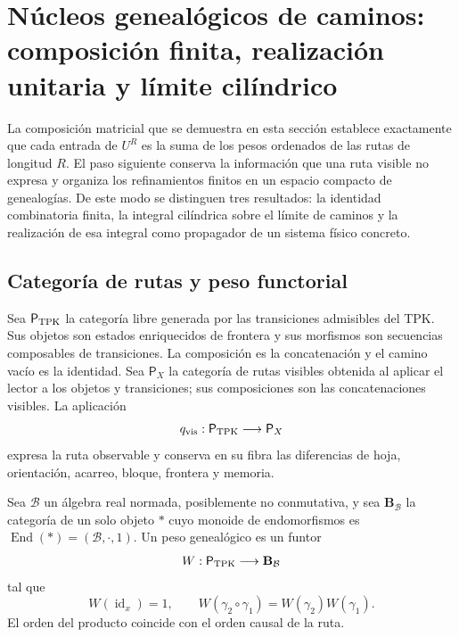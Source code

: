 \section{Núcleos genealógicos de caminos: composición finita, realización unitaria y límite cilíndrico}
\label{sec:integral-genealogica-caminos-rev2}

La composición matricial que se demuestra en esta sección establece exactamente que cada entrada de
\(U^R\) es la suma de los pesos ordenados de las rutas de longitud \(R\).
El paso siguiente conserva la información que una ruta visible no expresa y
organiza los refinamientos finitos en un espacio compacto de genealogías. De
este modo se distinguen tres resultados: la identidad combinatoria finita, la
integral cilíndrica sobre el límite de caminos y la realización de esa
integral como propagador de un sistema físico concreto.

\subsection{Categoría de rutas y peso functorial}

Sea \(\mathsf P_{\rm TPK}\) la categoría libre generada por las transiciones
admisibles del TPK. Sus objetos son estados enriquecidos de frontera y sus
morfismos son secuencias composables de transiciones. La composición es la
concatenación y el camino vacío es la identidad. Sea \(\mathsf P_X\)
la categoría de rutas visibles obtenida al aplicar el lector a los
objetos y transiciones; sus composiciones son las concatenaciones visibles.
La aplicación
\[
 q_{\rm vis}:\mathsf P_{\rm TPK}\longrightarrow\mathsf P_X
\]
expresa la ruta observable y conserva en su fibra las diferencias de hoja,
orientación, acarreo, bloque, frontera y memoria.

\begin{definition}
\label{def:peso-genealogico-caminos-rev2}
Sea \(\mathcal B\) un álgebra real normada, posiblemente no conmutativa, y
sea \(\mathbf B_{\mathcal B}\) la categoría de un solo objeto \(\ast\) cuyo
monoide de endomorfismos es
\(\operatorname{End}(\ast)=(\mathcal B,\cdot,1)\). Un peso genealógico es un funtor
\[
 W:\mathsf P_{\rm TPK}\longrightarrow\mathbf B_{\mathcal B}
\]
tal que
\[
 W(\operatorname{id}_x)=1,
 \qquad
 W(\gamma_2\circ\gamma_1)=W(\gamma_2)W(\gamma_1).
\]
El orden del producto coincide con el orden causal de la ruta.
\end{definition}

